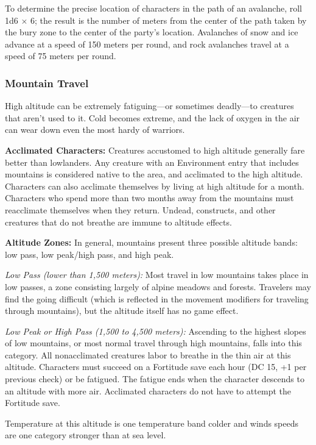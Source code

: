 To determine the precise location of characters in the path of an avalanche, roll 1d6 $\times$ 6; the result is the number of meters from the center of the path taken by the bury zone to the center of the party's location. Avalanches of snow and ice advance at a speed of 150 meters per round, and rock avalanches travel at a speed of 75 meters per round.

\subsubsection{Mountain Travel}
High altitude can be extremely fatiguing---or sometimes deadly---to creatures that aren't used to it. Cold becomes extreme, and the lack of oxygen in the air can wear down even the most hardy of warriors.

\textbf{Acclimated Characters:} Creatures accustomed to high altitude generally fare better than lowlanders. Any creature with an Environment entry that includes mountains is considered native to the area, and acclimated to the high altitude. Characters can also acclimate themselves by living at high altitude for a month. Characters who spend more than two months away from the mountains must reacclimate themselves when they return. Undead, constructs, and other creatures that do not breathe are immune to altitude effects.

\textbf{Altitude Zones:} In general, mountains present three possible altitude bands: low pass, low peak/high pass, and high peak.

\textit{Low Pass (lower than 1,500 meters):} Most travel in low mountains takes place in low passes, a zone consisting largely of alpine meadows and forests. Travelers may find the going difficult (which is reflected in the movement modifiers for traveling through mountains), but the altitude itself has no game effect.

\textit{Low Peak or High Pass (1,500 to 4,500 meters):} Ascending to the highest slopes of low mountains, or most normal travel through high mountains, falls into this category. All nonacclimated creatures labor to breathe in the thin air at this altitude. Characters must succeed on a Fortitude save each hour (DC 15, +1 per previous check) or be fatigued. The fatigue ends when the character descends to an altitude with more air. Acclimated characters do not have to attempt the Fortitude save.

Temperature at this altitude is one temperature band colder and winds speeds are one category stronger than at sea level.

